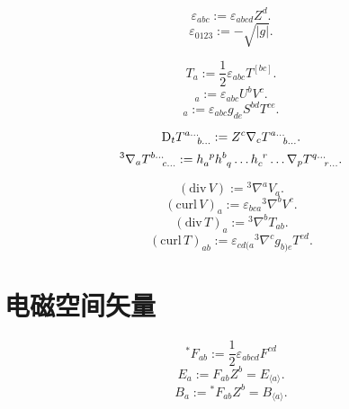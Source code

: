 \begin{equation}
    \varepsilon_{abc}:=\varepsilon_{abcd}Z^d.
\end{equation}
\begin{equation}
    \varepsilon_{0123}:=-\sqrt{\left\lvert g\right\rvert }.
\end{equation}

\begin{equation}
    T_a:=\frac{1}{2}\varepsilon_{abc}T^{[bc]}.
\end{equation}
\begin{equation}
    [U,V]_a:=\varepsilon_{abc}U^bV^c.
\end{equation}
\begin{equation}
    [S,T]_a:=\varepsilon_{abc}g_{de}S^{bd}T^{ce}.
\end{equation}

\begin{equation}
    \text{D}_tT^{a\dots}_{\ph{a\dots}b\dots}:=Z^c\nabla_c T^{a\dots}_{\ph{a\dots}b\dots}.
\end{equation}
\begin{equation}
    {}^3\nabla_a T^{b\dots}_{\ph{b\dots}c\dots}:=h_a^{\ph{a}p}h^b_{\ph{b}q}\dots h_c^{\ph{c}r}\dots\nabla_p T^{q\dots}_{\ph{q\dots}r\dots}.
\end{equation}

\begin{equation}
    (\text{div}\,V):={}^3\nabla^aV_a.
\end{equation}
\begin{equation}
    (\text{curl}\,V)_a:=\varepsilon_{bca}{}^3\nabla^bV^c.
\end{equation}
\begin{equation}
    (\text{div}\,T)_a:={}^3\nabla^bT_{ab}.
\end{equation}
\begin{equation}
    (\text{curl}\,T)_{ab}:=
    \varepsilon_{cd(a}{}^3\nabla^cg_{b)e}T^{ed}.
\end{equation}

\section{电磁空间矢量}

\begin{equation}
    {}^*\!F_{ab}:=\frac{1}{2}\varepsilon_{abcd}F^{cd}
\end{equation}
\begin{equation}
    E_a:=F_{ab}Z^b=E_{\langle a\rangle}.
\end{equation}
\begin{equation}
    B_a:={}^*\!F_{ab}Z^b=B_{\langle a\rangle}.
\end{equation}

